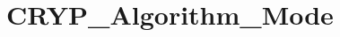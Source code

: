 \hypertarget{group___c_r_y_p___algorithm___mode}{\section{C\-R\-Y\-P\-\_\-\-Algorithm\-\_\-\-Mode}
\label{group___c_r_y_p___algorithm___mode}
}
